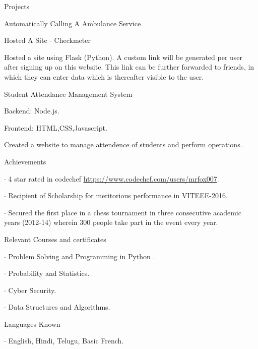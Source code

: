 \documentclass{resume} %
\begin{document}
\begin{rSection}{Projects}
\begin{rSubsection}{ Automatically Calling A Ambulance Service}{}{}
\end{rSubsection}


\begin{rSubsection}{ Hosted A Site - Checkmeter}{}{}

\item Hosted a site using Flask (Python). A custom link will be generated per user after signing up on this website. This link can be further forwarded to friends, in which they can enter data which is thereafter visible to the user.

\end{rSubsection}

\begin{rSubsection}{ Student Attendance Management System}{}{}

    \item Backend: Node.js.
    \item Frontend: HTML,CSS,Javascript.
    \item Created a website to manage attendence of students and perform operations.

\end{rSubsection}

\end{rSection}



\begin{rSection}{Achievements} \itemsep -5pt
    \item $\cdot$ 4 star rated in codechef \url{https://www.codechef.com/users/mrfox007}.
    \item $\cdot$ Recipient of Scholarship for meritorious performance in VITEEE-2016.
    \item $\cdot$ Secured the first place in a chess tournament in three consecutive academic years (2012-14) wherein \phantom{x} 300 people take part in the event every year.
\end{rSection}

\begin{rSection}{Relevant Courses and certificates} \itemsep -4pt \topmargin -50pt
    \item $\cdot$ Problem Solving and Programming in Python .
    \item $\cdot$ Probability and Statistics.
    \item $\cdot$ Cyber Security.
    \item $\cdot$ Data Structures and Algorithms.
\end{rSection}

\begin{rSection}{Languages Known} \itemsep -4pt
    \item $\cdot$ English, Hindi, Telugu, Basic French.
\end{rSection}
\end{document}
